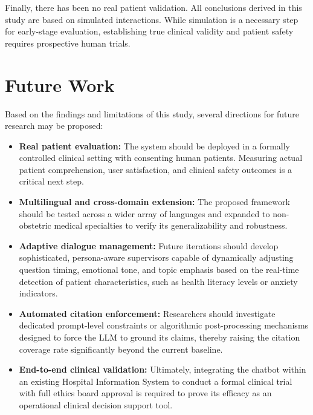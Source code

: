 Finally, there has been no real patient validation. 
All conclusions derived in this study are based on simulated interactions. 
While simulation is a necessary step for early-stage evaluation, establishing true clinical validity and patient safety requires prospective human trials.

\section{Future Work}

Based on the findings and limitations of this study, several directions for future research may be proposed:
\begin{itemize}
    \item \textbf{Real patient evaluation:} The system should be deployed in a formally controlled clinical setting with consenting human patients. Measuring actual patient comprehension, user satisfaction, and clinical safety outcomes is a critical next step.
    \item \textbf{Multilingual and cross-domain extension:} The proposed framework should be tested across a wider array of languages and expanded to non-obstetric medical specialties to verify its generalizability and robustness.
    \item \textbf{Adaptive dialogue management:} Future iterations should develop sophisticated, persona-aware supervisors capable of dynamically adjusting question timing, emotional tone, and topic emphasis based on the real-time detection of patient characteristics, such as health literacy levels or anxiety indicators.
    \item \textbf{Automated citation enforcement:} Researchers should investigate dedicated prompt-level constraints or algorithmic post-processing mechanisms designed to force the LLM to ground its claims, thereby raising the citation coverage rate significantly beyond the current baseline.
    \item \textbf{End-to-end clinical validation:} Ultimately, integrating the chatbot within an existing Hospital Information System to conduct a formal clinical trial with full ethics board approval is required to prove its efficacy as an operational clinical decision support tool.
\end{itemize}
